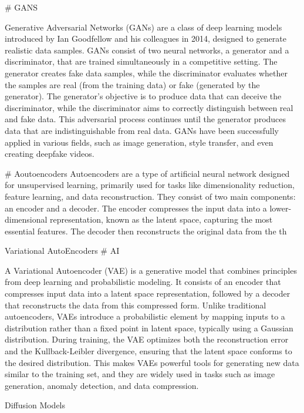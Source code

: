 
# GANS

Generative Adversarial Networks (GANs) are a class of deep learning models introduced by Ian Goodfellow and his colleagues in 2014, designed to generate realistic data samples. GANs consist of two neural networks, a generator and a discriminator, that are trained simultaneously in a competitive setting. The generator creates fake data samples, while the discriminator evaluates whether the samples are real (from the training data) or fake (generated by the generator). The generator's objective is to produce data that can deceive the discriminator, while the discriminator aims to correctly distinguish between real and fake data. This adversarial process continues until the generator produces data that are indistinguishable from real data. GANs have been successfully applied in various fields, such as image generation, style transfer, and even creating deepfake videos.


# Aoutoencoders
Autoencoders are a type of artificial neural network designed for unsupervised learning, primarily used for tasks like dimensionality reduction, feature learning, and data reconstruction. They consist of two main components: an encoder and a decoder. The encoder compresses the input data into a lower-dimensional representation, known as the latent space, capturing the most essential features. The decoder then reconstructs the original data from the th


Variational AutoEncoders
# AI

A Variational Autoencoder (VAE) is a generative model that combines principles from deep learning and probabilistic modeling. It consists of an encoder that compresses input data into a latent space representation, followed by a decoder that reconstructs the data from this compressed form. Unlike traditional autoencoders, VAEs introduce a probabilistic element by mapping inputs to a distribution rather than a fixed point in latent space, typically using a Gaussian distribution. During training, the VAE optimizes both the reconstruction error and the Kullback-Leibler divergence, ensuring that the latent space conforms to the desired distribution. This makes VAEs powerful tools for generating new data similar to the training set, and they are widely used in tasks such as image generation, anomaly detection, and data compression.


Diffusion Models



